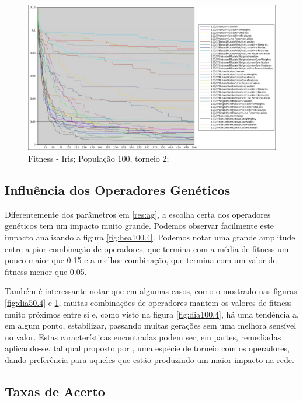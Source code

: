 \documentclass[12pt]{article}
\begin{document}
\begin{figure}[hbp]
\center
\includegraphics[scale=0.4, keepaspectratio]{iri_100_2.jpg} 
\caption{Fitness - Iris; População 100, torneio 2;}
\label{fig:iri100.2}
\end{figure}

\subsection{Influência dos Operadores Genéticos}

Diferentemente dos parâmetros em \ref{res:ag}, a escolha certa dos operadores genéticos tem um impacto muito grande. Podemos observar facilmente este impacto analisando a figura \ref{fig:hea100.4}. Podemos notar uma grande amplitude entre a pior combinação de operadores, que termina com a média de fitness um pouco maior que 0.15 e a melhor combinação, que termina com um valor de fitness menor que 0.05.

Também é interessante notar que em algumas casos, como o mostrado nas figuras \ref{fig:dia50.4} e \ref{fig:iri100.2}, muitas combinações de operadores mantem os valores de fitness muito próximos entre si e, como visto na figura \ref{fig:dia100.4}, há uma tendência a, em algum ponto, estabilizar, passando muitas gerações sem uma melhora sensível no valor. Estas características encontradas podem ser, em partes, remediadas aplicando-se, tal qual proposto por \cite{montana}, uma espécie de torneio com os operadores, dando preferência para aqueles que estão produzindo um maior impacto na rede.

\subsection{Taxas de Acerto}
\end{document}
